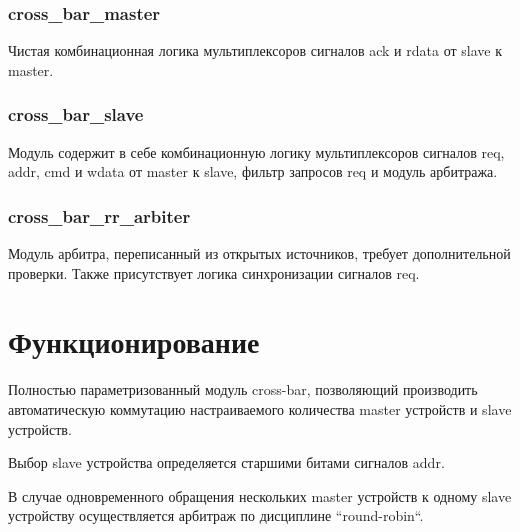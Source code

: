 \documentclass[a4paper, 10pt]{article}
\begin{document}
\subsubsection{cross\_bar\_master}
Чистая комбинационная логика мультиплексоров сигналов ack и rdata от slave к master.

\subsubsection{cross\_bar\_slave}
Модуль содержит в себе комбинационную логику мультиплексоров сигналов req, addr, cmd и wdata от master к slave, фильтр запросов req и модуль арбитража.

\subsubsection{cross\_bar\_rr\_arbiter}
Модуль арбитра, переписанный из открытых источников, требует дополнительной проверки.
Также присутствует логика синхронизации сигналов req.

\newpage{}
\section{Функционирование}
Полностью параметризованный модуль cross-bar, позволяющий производить автоматическую коммутацию настраиваемого количества master устройств и slave устройств.

Выбор slave устройства определяется старшими битами сигналов addr.

В случае одновременного обращения нескольких master устройств к одному slave устройству осуществляется арбитраж по дисциплине ``round-robin``.
\end{document}
